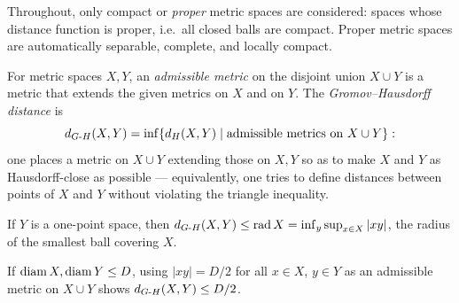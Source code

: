 \begin{convention}
  \label{conv:pet-ch11-compact-proper-spaces}
  Throughout, only compact or \emph{proper} metric spaces are considered:
  spaces whose distance function is proper, i.e.\ all closed balls are
  compact. Proper metric spaces are automatically separable, complete, and
  locally compact.
\end{convention}

\begin{definition}
  \label{def:pet-ch11-gromov-hausdorff-distance}
  For metric spaces $X,Y$, an \emph{admissible metric} on the disjoint union
  $X\cup Y$ is a metric that extends the given metrics on $X$ and on $Y$. The
  \emph{Gromov--Hausdorff distance} is
  \[
    d_{G\text{-}H}(X,Y)=\inf\{d_H(X,Y)\mid\text{admissible metrics on }X\cup Y\}:
  \]
  one places a metric on $X\cup Y$ extending those on $X,Y$ so as to make $X$
  and $Y$ as Hausdorff-close as possible — equivalently, one tries to define
  distances between points of $X$ and $Y$ without violating the triangle
  inequality.
\end{definition}

\begin{example}
  \label{ex:pet-ch11-gh-distance-radius}
  If $Y$ is a one-point space, then
  $d_{G\text{-}H}(X,Y)\le\operatorname{rad}X=\inf_{y}\sup_{x\in X}|xy|$, the radius of
  the smallest ball covering $X$.
\end{example}

\begin{example}
  \label{ex:pet-ch11-gh-distance-diameter-bound}
  If $\operatorname{diam} X,\operatorname{diam} Y\le D$, using $|xy|=D/2$ for all $x\in X$, $y\in Y$ as an
  admissible metric on $X\cup Y$ shows $d_{G\text{-}H}(X,Y)\le D/2$.
\end{example}

